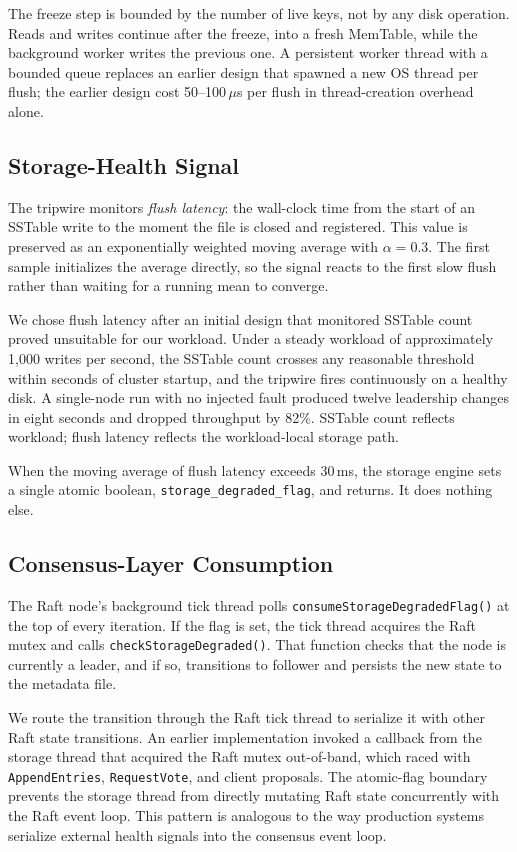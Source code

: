 \documentclass[conference, a4paper]{IEEEtran}
\begin{document}
The freeze step is bounded by the number of live keys, not by any disk
operation. Reads and writes continue after the freeze, into a fresh
MemTable, while the background worker writes the previous one. A
persistent worker thread with a bounded queue replaces an earlier
design that spawned a new OS thread per flush; the earlier design cost
50--100\,$\mu$s per flush in thread-creation overhead alone.

\subsection{Storage-Health Signal}

The tripwire monitors \emph{flush latency}: the wall-clock time from the
start of an SSTable write to the moment the file is closed and
registered. This value is preserved as an exponentially weighted moving
average with $\alpha = 0.3$. The first sample initializes the average
directly, so the signal reacts to the first slow flush rather than
waiting for a running mean to converge.

We chose flush latency after an initial design that monitored SSTable
count proved unsuitable for our workload. Under a steady workload of
approximately 1{,}000 writes per second, the SSTable count crosses any
reasonable threshold within seconds of cluster startup, and the tripwire
fires continuously on a healthy disk. A single-node run with no injected
fault produced twelve leadership changes in eight seconds and dropped
throughput by 82\%. SSTable count reflects workload; flush latency
reflects the workload-local storage path.

When the moving average of flush latency exceeds 30\,ms, the storage
engine sets a single atomic boolean, \texttt{storage\_degraded\_flag},
and returns. It does nothing else.

\subsection{Consensus-Layer Consumption}

The Raft node's background tick thread polls
\texttt{consumeStorageDegradedFlag()} at the top of every iteration. If
the flag is set, the tick thread acquires the Raft mutex and calls
\texttt{checkStorageDegraded()}. That function checks that the node is
currently a leader, and if so, transitions to follower and persists the
new state to the metadata file.

We route the transition through the Raft tick thread to serialize it
with other Raft state transitions. An earlier implementation invoked a
callback from the storage thread that acquired the Raft mutex
out-of-band, which raced with \texttt{AppendEntries},
\texttt{RequestVote}, and client proposals. The atomic-flag boundary
prevents the storage thread from directly mutating Raft state
concurrently with the Raft event loop. This pattern is analogous to the
way production systems serialize external health signals into the
consensus event loop.
\end{document}
